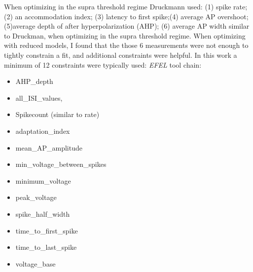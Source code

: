 When optimizing in the supra threshold regime Druckmann used:
(1) spike rate; (2) an accommodation index; (3) latency to first spike;(4) average AP overshoot; (5)average depth of after hyperpolarization (AHP); 
(6) average AP width similar to Druckman, when optimizing in the supra threshold regime.
When optimizing with reduced models, I found that the those 6 measurements were not enough to tightly constrain a fit, and additional constraints were helpful. In this work a minimum of 12 constraints were typically used:
\emph{EFEL} tool chain:
\begin{itemize}
\item AHP_depth
\item all_ISI_values,
\item Spikecount (similar to rate)
\item adaptation_index
\item mean_AP_amplitude  
\item min_voltage_between_spikes
\item minimum_voltage
\item peak_voltage
\item spike_half_width
\item time_to_first_spike
\item time_to_last_spike
\item voltage_base
\end{itemize}
